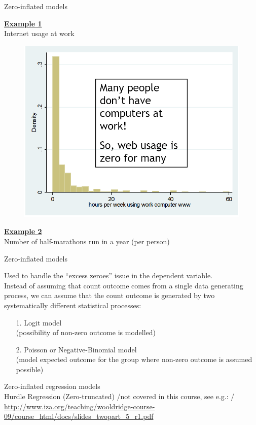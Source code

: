 \documentclass[usenames,dvipsnames]{beamer}
\begin{document}
\begin{frame}{Zero-inflated models}
\begin{minipage}[t]{.49\textwidth}
\underline{\textbf{Example 1}}\\

Internet usage at work
\begin{figure}
\centering
\includegraphics[width=\textwidth]{./img/P11_6}
\end{figure}
\end{minipage}%
\hspace*{7mm}
\begin{minipage}[t]{.49\textwidth}
\underline{\textbf{Example 2}} \\

Number of half-marathons run in a year (per person)
\end{minipage}
\end{frame}
\begin{frame}{Zero-inflated models}

{\small
Used to handle the “excess zeroes” issue in the dependent variable. \\
\medskip
Instead of assuming that count outcome comes from a single data generating process, we can assume that the count outcome is generated by two systematically different statistical processes:
\begin{itemize}
\item[1.] Logit model \\
(possibility of non-zero outcome is modelled)
\item[2.] Poisson or Negative-Binomial model \\
(model expected outcome for the group where non-zero outcome is assumed possible)
\end{itemize}}
\bigskip
{\footnotesize
Zero-inflated regression models\\
\medskip
Hurdle Regression (Zero-truncated)    /not covered in this course, see e.g.: / \tiny \textcolor{Blue}{\url{http://www.iza.org/teaching/wooldridge-course-09/course_html/docs/slides_twopart_5_r1.pdf }}}
\end{frame}
\end{document}
